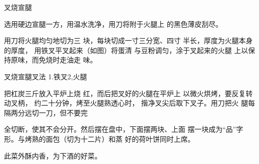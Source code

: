 \begin{recipe}{叉烧宣腿}

\ingredients


\cooking

\step 选用硬边宣腿一方，用温水洗净，用刀将附于火腿上 的黑色薄皮刮尽。

\step 用刀将火腿均匀地切为三 块，每块切成一寸三分宽、四寸 半长，厚度为火腿本身的厚度， 用铁叉平叉起来（如图）将蛋清 与豆粉调匀，涂于叉起来的火腿 上以保持原味，而免烧时走油走 味。

叉烧宣腿叉法 1.铁叉2,火腿

\step 把杠炭三斤放入平炉上烧 红，而后把叉好的火腿在平炉上 以微火烘烤，要反复转动叉柄， 约二十分钟，烤至火腿熟透心时， 揩净叉尖后取下叉子。用刀把火 腿每隔两分远切一刀，但不要完

全切断，使其不会分开。然后摆在盘中，下面摆两块、上面 摆一块成为“品”字形。与烤熟的面包（切为十二片）和蒸 好的荷叶饼同时上席。

\notes

此菜外酥内香，为下酒的好菜。

\end{recipe}

